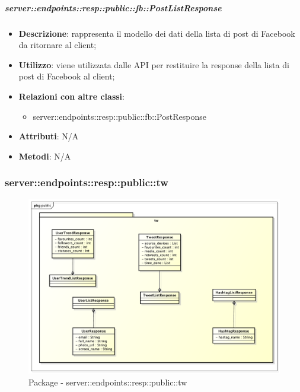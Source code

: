     \subparagraph{server::endpoints::resp::public::fb::PostListResponse} %
    \label{subp:bdsm_app_server_endpoints_resp_public_fb_postlistresponse}
    \begin{itemize}
      \item \textbf{Descrizione}: rappresenta il modello dei dati della lista di post di Facebook da ritornare al client;
      \item \textbf{Utilizzo}: viene utilizzata dalle API per restituire la response della lista di post di Facebook al client;
      \item \textbf{Relazioni con altre classi}:
        \begin{itemize}
          \item server::endpoints::resp::public::fb::PostResponse
        \end{itemize}
    \item \textbf{Attributi}: N/A
    \item \textbf{Metodi}: N/A
      \end{itemize}

\subsubsection{server::endpoints::resp::public::tw} %
\label{ssub:bdsm_app_server_endpoints_resp_public_tw}
\begin{figure}[!htbp]
  \centering
  \centerline{\includegraphics[scale=0.5]{./images/server/resp_tw.pdf}}
  \caption{Package - server::endpoints::resp::public::tw}
\end{figure}

